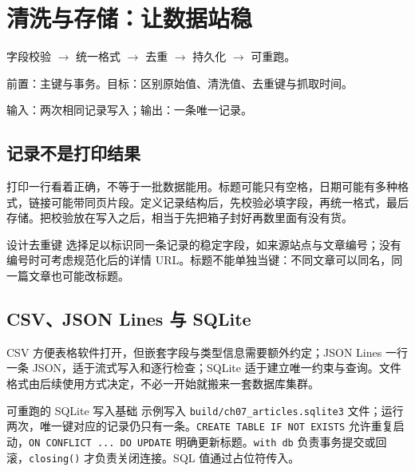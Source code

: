 \chapter{清洗与存储：让数据站稳}\label{ch:storage}
\begin{tcolorbox}[title=章首知识地图,colframe=Ink]
字段校验 $\longrightarrow$ 统一格式 $\longrightarrow$ 去重 $\longrightarrow$ 持久化 $\longrightarrow$ 可重跑。
\end{tcolorbox}

\begin{tcolorbox}[title=学习目标与前置知识,colframe=Ink!65,colback=Ink!2]
前置：主键与事务。目标：区别原始值、清洗值、去重键与抓取时间。\par
输入：两次相同记录写入；输出：一条唯一记录。
\end{tcolorbox}

\section{记录不是打印结果}
打印一行看着正确，不等于一批数据能用。标题可能只有空格，日期可能有多种格式，链接可能带同页片段。定义记录结构后，先校验必填字段，再统一格式，最后存储。把校验放在写入之后，相当于先把箱子封好再数里面有没有货。

\begin{method}{设计去重键}
选择足以标识同一条记录的稳定字段，如来源站点与文章编号；没有编号时可考虑规范化后的详情 URL。标题不能单独当键：不同文章可以同名，同一篇文章也可能改标题。
\end{method}

\section{CSV、JSON Lines 与 SQLite}
CSV 方便表格软件打开，但嵌套字段与类型信息需要额外约定；JSON Lines 一行一条 JSON，适于流式写入和逐行检查；SQLite 适于建立唯一约束与查询。文件格式由后续使用方式决定，不必一开始就搬来一套数据库集群。

\begin{example}{可重跑的 SQLite 写入}{基础}
示例写入 \texttt{build/ch07\_articles.sqlite3} 文件；运行两次，唯一键对应的记录仍只有一条。\texttt{CREATE TABLE IF NOT EXISTS} 允许重复启动，\texttt{ON CONFLICT ... DO UPDATE} 明确更新标题。\texttt{with db} 负责事务提交或回滚，\texttt{closing()} 才负责关闭连接。SQL 值通过占位符传入。
\par\medskip
{}
\end{example}


